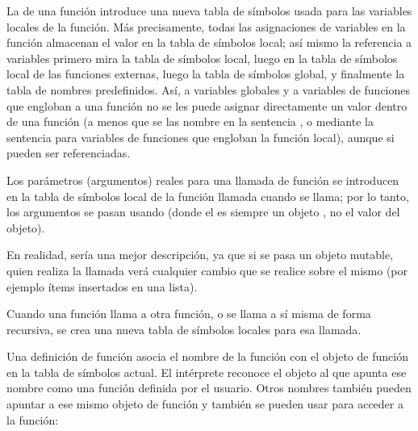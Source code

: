 \documentclass[a4,10pt,spanish]{sphinxmanual}
\begin{document}
\sphinxAtStartPar
La  de una función introduce una nueva tabla de símbolos usada para las variables locales de la función. Más precisamente, todas las asignaciones de variables en la función almacenan el valor en la tabla de símbolos local; así mismo la referencia a variables primero mira la tabla de símbolos local, luego en la tabla de símbolos local de las funciones externas, luego la tabla de símbolos global, y finalmente la tabla de nombres predefinidos. Así, a variables globales y a variables de funciones que engloban a una función no se les puede asignar directamente un valor dentro de una función (a menos que se las nombre en la sentencia , o mediante la sentencia  para variables de funciones que engloban la función local), aunque si pueden ser referenciadas.

\sphinxAtStartPar
Los parámetros (argumentos) reales para una llamada de función se introducen en la tabla de símbolos local de la función llamada cuando se llama; por lo tanto, los argumentos se pasan usando  (donde el  es siempre un objeto , no el valor del objeto). %
\begin{footnote}[1]\sphinxAtStartFootnote
En realidad,  sería una mejor descripción, ya que si se pasa un objeto mutable, quien realiza la llamada verá cualquier cambio que se realice sobre el mismo (por ejemplo ítems insertados en una lista).
%
\end{footnote} Cuando una función llama a otra función, o se llama a sí misma de forma recursiva, se crea una nueva tabla de símbolos locales para esa llamada.

\sphinxAtStartPar
Una definición de función asocia el nombre de la función con el objeto de función en la tabla de símbolos actual. El intérprete reconoce el objeto al que apunta ese nombre como una función definida por el usuario. Otros nombres también pueden apuntar a ese mismo objeto de función y también se pueden usar para acceder a la función:

\begin{sphinxVerbatim}[commandchars=\\\{\}]
  
\end{sphinxVerbatim}
\end{document}

